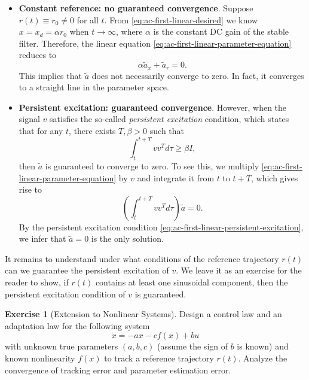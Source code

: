 \documentclass[
]{book}
\theoremstyle{definition}
\theoremstyle{definition}
\theoremstyle{definition}
\newtheorem{exercise}{Exercise}[chapter]
\theoremstyle{definition}
\theoremstyle{remark}
\begin{document}
\begin{itemize}
\item
  \textbf{Constant reference: no guaranteed convergence}. Suppose \(r(t) \equiv r_0 \neq 0\) for all \(t\). From \eqref{eq:ac-first-linear-desired} we know \(x = x_d = \alpha r_0\) when \(t \rightarrow \infty\), where \(\alpha\) is the constant DC gain of the stable filter. Therefore, the linear equation \eqref{eq:ac-first-linear-parameter-equation} reduces to
  \[
  \alpha \tilde{a}_x + \tilde{a}_r  = 0. 
  \]
  This implies that \(\tilde{a}\) does not necessarily converge to zero. In fact, it converges to a straight line in the parameter space.
\item
  \textbf{Persistent excitation: guaranteed convergence}. However, when the signal \(v\) satisfies the so-called \emph{persistent excitation} condition, which states that for any \(t\), there exists \(T, \beta > 0\) such that
  \begin{equation}
  \int_{t}^{t+T} v v^T d\tau \geq \beta I,
  \label{eq:ac-first-linear-persistent-excitation}
  \end{equation}
  then \(\tilde{a}\) is guaranteed to converge to zero. To see this, we multiply \eqref{eq:ac-first-linear-parameter-equation} by \(v\) and integrate it from \(t\) to \(t+T\), which gives rise to
  \[
  \left( \int_{t}^{t+T} vv^T d\tau \right) \tilde{a} = 0.
  \]
  By the persistent excitation condition \eqref{eq:ac-first-linear-persistent-excitation}, we infer that \(\tilde{a} = 0\) is the only solution.
\end{itemize}

It remains to understand under what conditions of the reference trajectory \(r(t)\) can we guarantee the persistent excitation of \(v\). We leave it as an exercise for the reader to show, if \(r(t)\) contains at least one sinusoidal component, then the persistent excitation condition of \(v\) is guaranteed.

\begin{exercise}[Extension to Nonlinear Systems]
\protect\hypertarget{exr:adaptivecontrolfirstordernonlinearsystem}{}\label{exr:adaptivecontrolfirstordernonlinearsystem}Design a control law and an adaptation law for the following system
\[
\dot{x} = - a x - c f(x) + b u
\]
with unknown true parameters \((a,b,c)\) (assume the sign of \(b\) is known) and known nonlinearity \(f(x)\) to track a reference trajectory \(r(t)\). Analyze the convergence of tracking error and parameter estimation error.
\end{exercise}
\end{document}
